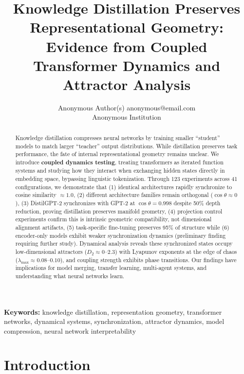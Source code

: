 \documentclass[10pt]{article} %
\title{Knowledge Distillation Preserves Representational Geometry:\\ Evidence from Coupled Transformer Dynamics and Attractor Analysis}
\author{\name Anonymous Author(s) \email anonymous@email.com \\
      \addr Anonymous Institution}
\theoremstyle{plain}
\theoremstyle{definition}
\theoremstyle{remark}
\begin{document}
\maketitle

\begin{abstract}
Knowledge distillation compresses neural networks by training smaller ``student'' models to match larger ``teacher'' output distributions. While distillation preserves task performance, the fate of internal representational geometry remains unclear. We introduce \textbf{coupled dynamics testing}, treating transformers as iterated function systems and studying how they interact when exchanging hidden states directly in embedding space, bypassing linguistic tokenization. Through 123 experiments across 41 configurations, we demonstrate that (1) identical architectures rapidly synchronize to cosine similarity $\approx 1.0$, (2) different architecture families remain orthogonal ($\cos \theta \approx 0$), (3) DistilGPT-2 synchronizes with GPT-2 at $\cos \theta = 0.998$ despite 50\% depth reduction, proving distillation preserves manifold geometry, (4) projection control experiments confirm this is intrinsic geometric compatibility, not dimensional alignment artifacts, (5) task-specific fine-tuning preserves 95\% of structure while (6) encoder-only models exhibit weaker synchronization dynamics (preliminary finding requiring further study). Dynamical analysis reveals these synchronized states occupy low-dimensional attractors ($D_2 \approx 0$--$2.3$) with Lyapunov exponents at the edge of chaos ($\lambda_{\max} \approx 0.08$--$0.10$), and coupling strength exhibits phase transitions. Our findings have implications for model merging, transfer learning, multi-agent systems, and understanding what neural networks learn.
\end{abstract}

\textbf{Keywords:} knowledge distillation, representation geometry, transformer networks, dynamical systems, synchronization, attractor dynamics, model compression, neural network interpretability

\section{Introduction}
\end{document}
